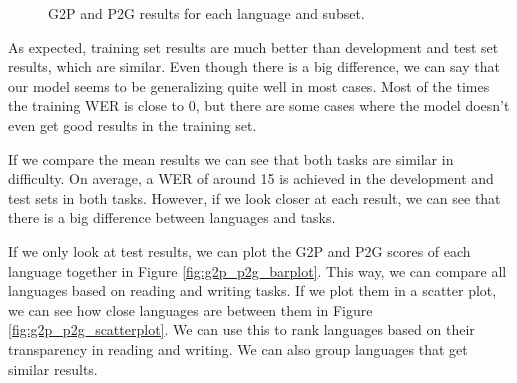 \documentclass[11pt,a4paper]{article}
\begin{document}
\begin{figure}
    \centering
    \caption{G2P and P2G results for each language and subset.}
    \label{fig:g2p_p2g_results}
\end{figure}

As expected, training set results are much better than development and test set results, which are similar. Even though there is a big difference, we can say that our model seems to be generalizing quite well in most cases. Most of the times the training WER is close to 0, but there are some cases where the model doesn't even get good results in the training set.

If we compare the mean results we can see that both tasks are similar in difficulty. On average, a WER of around 15 is achieved in the development and test sets in both tasks. However, if we look closer at each result, we can see that there is a big difference between languages and tasks.

If we only look at test results, we can plot the G2P and P2G scores of each language together in Figure \ref{fig:g2p_p2g_barplot}. This way, we can compare all languages based on reading and writing tasks. If we plot them in a scatter plot, we can see how close languages are between them in Figure \ref{fig:g2p_p2g_scatterplot}. We can use this to rank languages based on their transparency in reading and writing. We can also group languages that get similar results.
\end{document}
